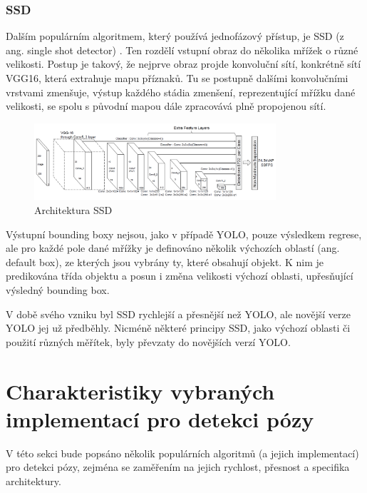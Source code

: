 \subsubsection*{SSD}
Dalším populárním algoritmem, který používá jednofázový přístup, je SSD (z ang.
single shot detector) \cite{szegedy:ssd}. Ten rozdělí vstupní obraz do několika
mřížek o různé velikosti. Postup je takový, že nejprve obraz projde konvoluční
sítí, konkrétně sítí VGG16, která extrahuje mapu příznaků. Tu se postupně
dalšími konvolučními vrstvami zmenšuje, výstup každého stádia zmenšení,
reprezentující mřížku dané velikosti, se spolu s původní mapou dále zpracovává
plně propojenou sítí.
\begin{figure}[]
    \centering
    \includegraphics[width=0.8\textwidth]{Figures/ssd.png}
    \caption{Architektura SSD \cite{szegedy:ssd}}
    \label{fig:ssd}
\end{figure}

Výstupní bounding boxy nejsou, jako v případě YOLO, pouze výsledkem regrese,
ale pro každé pole dané mřížky je definováno několik výchozích oblastí (ang.
default box), ze kterých jsou vybrány ty, které obsahují objekt. K nim je
predikována třída objektu a posun i změna velikosti výchozí oblasti,
upřesňující výsledný bounding box.

V době svého vzniku byl SSD rychlejší a přesnější než YOLO, ale novější verze
YOLO jej už předběhly. Nicméně některé principy SSD, jako výchozí oblasti či
použití různých měřítek, byly převzaty do novějších verzí YOLO.

\section{Charakteristiky vybraných implementací pro detekci pózy}

V této sekci bude popsáno několik populárních algoritmů (a jejich implementací)
pro detekci pózy, zejména se zaměřením na jejich rychlost, přesnost a specifika
architektury.

